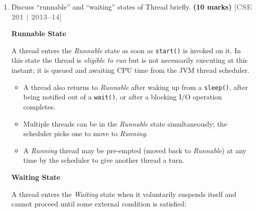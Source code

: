 \documentclass[12pt,a3paper]{article}
\newcommand{\yr}[1]{\hfill\textcolor{gray}{\small\textbf{[#1]}}}
\newcommand{\mk}[1]{\textcolor{orange!70!black}{\small\textbf{(#1 marks)}}}
\begin{document}
\begin{enumerate}
\begin{tcolorbox}[enhanced,breakable,ansbox,
 colback=cF!4,colframe=cF,boxrule=0.8pt,arc=5pt,
 title={\textbf{Answer — Thread Life-Cycle (State Diagram)}},
 fonttitle=\bfseries\color{white},colbacktitle=cF]
\begin{enumerate}[label=\textbf{\arabic*.}]
 \item \textbf{Blocking} --- A thread is blocked when it is waiting for an I/O operation to complete or waiting to acquire a locked Monitor (e.g., entering a \texttt{synchronized} block). It returns to Ready-to-Run when the I/O is completed or the lock is acquired.

 \item \textbf{Dead} --- The thread enters this final state when its \texttt{run()} method completes or it forcibly exits. A dead thread cannot be restarted.
\end{enumerate}

\end{tcolorbox}

\item Discuss ``runnable'' and ``waiting'' states of Thread briefly. \mk{10}
\yr{CSE 201 | 2013--14}

\begin{tcolorbox}[enhanced,breakable,ansbox,
  colback=cF!4,colframe=cF,boxrule=0.8pt,arc=5pt,
  title={\textbf{Answer — Runnable and Waiting States}},
  fonttitle=\bfseries\color{white},colbacktitle=cF]

\textbf{Runnable State}

A thread enters the \emph{Runnable} state as soon as \texttt{start()}
is invoked on it.  In this state the thread is \emph{eligible to run}
but is not necessarily executing at this instant; it is queued and
awaiting CPU time from the JVM thread scheduler.

\begin{itemize}[itemsep=2pt]
  \item A thread also returns to \emph{Runnable} after waking up from
    a \texttt{sleep()}, after being notified out of a \texttt{wait()},
    or after a blocking I/O operation completes.
  \item Multiple threads can be in the \emph{Runnable} state
    simultaneously; the scheduler picks one to move to
    \emph{Running}.
  \item A \emph{Running} thread may be pre-empted (moved back to
    \emph{Runnable}) at any time by the scheduler to give another
    thread a turn.
\end{itemize}

\medskip
\textbf{Waiting State}

A thread enters the \emph{Waiting} state when it voluntarily suspends
itself and cannot proceed until some external condition is satisfied:


\end{tcolorbox}
\end{enumerate}
\end{document}
